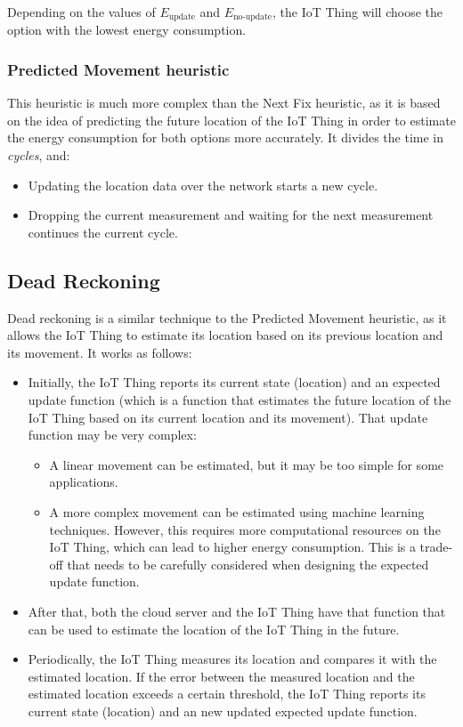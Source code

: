 Depending on the values of $E_{\text{update}}$ and $E_{\text{no-update}}$, the IoT Thing will choose the option with the lowest energy consumption.


\subsubsection{Predicted Movement heuristic}

This heuristic is much more complex than the Next Fix heuristic, as it is based on the idea of predicting the future location of the IoT Thing in order to estimate the energy consumption for both options more accurately. It divides the time in \emph{cycles}, and:
\begin{itemize}
    \item Updating the location data over the network starts a new cycle.
    \item Dropping the current measurement and waiting for the next measurement continues the current cycle.
\end{itemize}



\subsection{Dead Reckoning}

Dead reckoning is a similar technique to the Predicted Movement heuristic, as it allows the IoT Thing to estimate its location based on its previous location and its movement. It works as follows:
\begin{itemize}
    \item Initially, the IoT Thing reports its current state (location) and an expected update function (which is a function that estimates the future location of the IoT Thing based on its current location and its movement). That update function may be very complex:
    \begin{itemize}
        \item A linear movement can be estimated, but it may be too simple for some applications.
        \item A more complex movement can be estimated using machine learning techniques. However, this requires more computational resources on the IoT Thing, which can lead to higher energy consumption. This is a trade-off that needs to be carefully considered when designing the expected update function.
    \end{itemize}
    \item After that, both the cloud server and the IoT Thing have that function that can be used to estimate the location of the IoT Thing in the future.
    \item Periodically, the IoT Thing measures its location and compares it with the estimated location. If the error between the measured location and the estimated location exceeds a certain threshold, the IoT Thing reports its current state (location) and an new updated expected update function.
\end{itemize}


